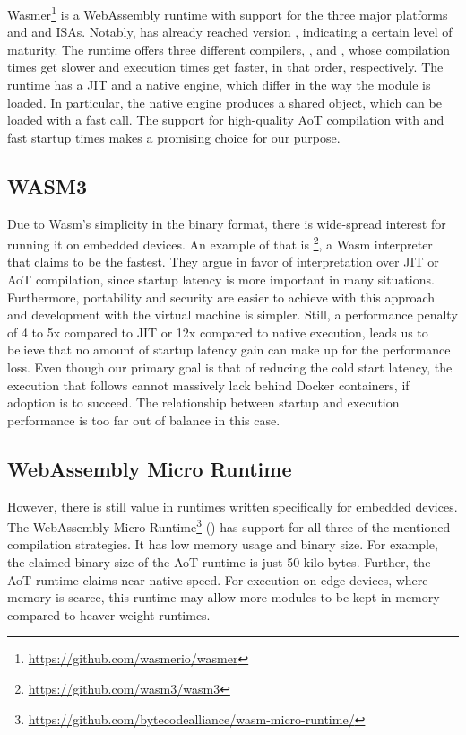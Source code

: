 Wasmer\footnote{\url{https://github.com/wasmerio/wasmer}} is a WebAssembly runtime with support for the three major platforms and  and  ISAs. Notably,  has already reached version , indicating a certain level of maturity. The runtime offers three different compilers, ,  and , whose compilation times get slower and execution times get faster, in that order, respectively. The runtime has a JIT and a native engine, which differ in the way the module is loaded. In particular, the native engine produces a shared object, which can be loaded with a fast  call. The support for high-quality AoT compilation with  and fast startup times makes  a promising choice for our purpose.

\subsection{WASM3}

Due to Wasm's simplicity in the binary format, there is wide-spread interest for running it on embedded devices. An example of that is \footnote{\url{https://github.com/wasm3/wasm3}}, a Wasm interpreter that claims to be the fastest. They argue in favor of interpretation over JIT or AoT compilation, since startup latency is more important in many situations. Furthermore, portability and security are easier to achieve with this approach and development with the virtual machine is simpler. Still, a performance penalty of 4 to 5x compared to JIT or 12x compared to native execution, leads us to believe that no amount of startup latency gain can make up for the performance loss. Even though our primary goal is that of reducing the cold start latency, the execution that follows cannot massively lack behind Docker containers, if adoption is to succeed. The relationship between startup and execution performance is too far out of balance in this case.

\subsection{WebAssembly Micro Runtime}

However, there is still value in runtimes written specifically for embedded devices. The WebAssembly Micro Runtime\footnote{\url{https://github.com/bytecodealliance/wasm-micro-runtime/}} () has support for all three of the mentioned compilation strategies. It has low memory usage and binary size. For example, the claimed binary size of the AoT runtime is just 50 kilo bytes. Further, the AoT runtime claims near-native speed. For execution on edge devices, where memory is scarce, this runtime may allow more modules to be kept in-memory compared to heaver-weight runtimes.

